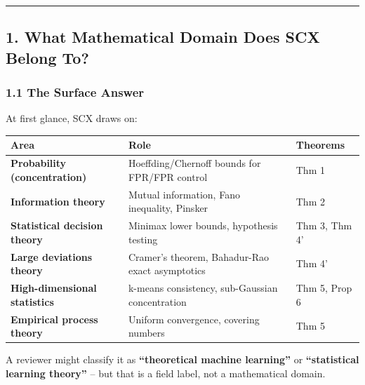 \documentclass[
  12pt,
]{ctexart}
\begin{document}
\begin{center}\rule{0.5\linewidth}{0.5pt}\end{center}

\subsection{1. What Mathematical Domain Does SCX Belong
To?}\label{what-mathematical-domain-does-scx-belong-to}

\subsubsection{1.1 The Surface Answer}\label{the-surface-answer}

At first glance, SCX draws on:

\begin{longtable}[]{@{}
  >{\raggedright\arraybackslash}p{}
  >{\raggedright\arraybackslash}p{}
  >{\raggedright\arraybackslash}p{}@{}}
\toprule\noalign{}
\begin{minipage}[b]{\linewidth}\raggedright
Area
\end{minipage} & \begin{minipage}[b]{\linewidth}\raggedright
Role
\end{minipage} & \begin{minipage}[b]{\linewidth}\raggedright
Theorems
\end{minipage} \\
\midrule\noalign{}
\endhead
\bottomrule\noalign{}
\endlastfoot
\textbf{Probability (concentration)} & Hoeffding/Chernoff bounds for
FPR/FPR control & Thm 1 \\
\textbf{Information theory} & Mutual information, Fano inequality,
Pinsker & Thm 2 \\
\textbf{Statistical decision theory} & Minimax lower bounds, hypothesis
testing & Thm 3, Thm 4' \\
\textbf{Large deviations theory} & Cramer's theorem, Bahadur-Rao exact
asymptotics & Thm 4' \\
\textbf{High-dimensional statistics} & k-means consistency, sub-Gaussian
concentration & Thm 5, Prop 6 \\
\textbf{Empirical process theory} & Uniform convergence, covering
numbers & Thm 5 \\
\end{longtable}

A reviewer might classify it as \textbf{``theoretical machine
learning''} or \textbf{``statistical learning theory''} -- but that is a
field label, not a mathematical domain.
\end{document}
